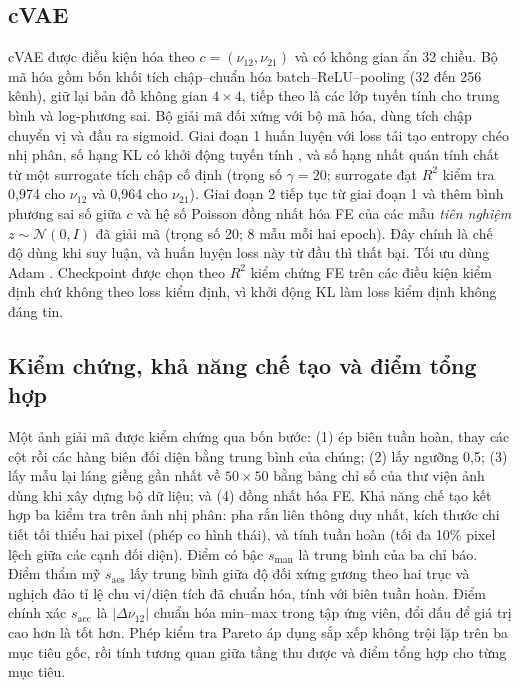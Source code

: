 \documentclass[a4paper,11pt]{article}
\newcommand{\nuot}{\nu_{12}}
\newcommand{\nuto}{\nu_{21}}
\newcommand{\RR}{R^2}
\begin{document}
\subsection{cVAE}
cVAE \citep{kingma2014vae,sohn2015cvae} được điều kiện hóa theo
$c=(\nuot,\nuto)$ và có không gian ẩn 32 chiều. Bộ mã hóa gồm bốn khối tích
chập--chuẩn hóa batch--ReLU--pooling (32 đến 256 kênh), giữ lại bản đồ không
gian $4\times4$, tiếp theo là các lớp tuyến tính cho trung bình và
log-phương sai. Bộ giải mã đối xứng với bộ mã hóa, dùng tích chập chuyển vị
và đầu ra sigmoid. Giai đoạn 1 huấn luyện với loss tái tạo entropy chéo nhị
phân, số hạng KL có khởi động tuyến tính \citep{bowman2016generating}, và số
hạng nhất quán tính chất từ một surrogate tích chập cố định (trọng số
$\gamma=20$; surrogate đạt $\RR$ kiểm tra 0,974 cho $\nuot$ và 0,964 cho
$\nuto$). Giai đoạn 2 tiếp tục từ giai đoạn 1 và thêm bình phương sai số
giữa $c$ và hệ số Poisson đồng nhất hóa FE của các mẫu \emph{tiên nghiệm}
$z\sim\mathcal N(0,I)$ đã giải mã (trọng số 20; 8 mẫu mỗi hai epoch). Đây
chính là chế độ dùng khi suy luận, và huấn luyện loss này từ đầu thì thất
bại. Tối ưu dùng Adam \citep{kingma2015adam}. Checkpoint được chọn theo $\RR$
kiểm chứng FE trên các điều kiện kiểm định chứ không theo loss kiểm định, vì
khởi động KL làm loss kiểm định không đáng tin.

\subsection{Kiểm chứng, khả năng chế tạo và điểm tổng hợp}
Một ảnh giải mã được kiểm chứng qua bốn bước: (1) ép biên tuần hoàn, thay các
cột rồi các hàng biên đối diện bằng trung bình của chúng; (2) lấy ngưỡng
0,5; (3) lấy mẫu lại láng giềng gần nhất về $50\times50$ bằng bảng chỉ số của
thư viện ảnh dùng khi xây dựng bộ dữ liệu; và (4) đồng nhất hóa FE. Khả năng
chế tạo kết hợp ba kiểm tra trên ảnh nhị phân: pha rắn liên thông duy nhất,
kích thước chi tiết tối thiểu hai pixel (phép co hình thái), và tính tuần
hoàn (tối đa 10\% pixel lệch giữa các cạnh đối diện). Điểm có bậc
$s_{\mathrm{man}}$ là trung bình của ba chỉ báo. Điểm thẩm mỹ
$s_{\mathrm{aes}}$ lấy trung bình giữa độ đối xứng gương theo hai trục và
nghịch đảo tỉ lệ chu vi/diện tích đã chuẩn hóa, tính với biên tuần hoàn. Điểm
chính xác $s_{\mathrm{acc}}$ là $|\Delta\nuot|$ chuẩn hóa min--max trong tập
ứng viên, đổi dấu để giá trị cao hơn là tốt hơn. Phép kiểm tra Pareto áp
dụng sắp xếp không trội lặp trên ba mục tiêu gốc, rồi tính tương quan giữa
tầng thu được và điểm tổng hợp cho từng mục tiêu.
\end{document}
